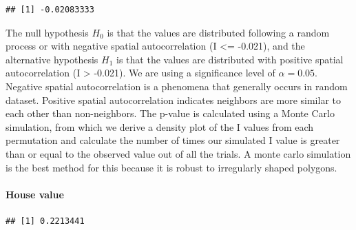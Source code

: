 \documentclass[
]{article}
\newenvironment{Shaded}{\begin{snugshade}}{\end{snugshade}}
\newcommand{\AttributeTok}[1]{\textcolor[rgb]{0.77,0.63,0.00}{#1}}
\newcommand{\CommentTok}[1]{\textcolor[rgb]{0.56,0.35,0.01}{\textit{#1}}}
\newcommand{\ConstantTok}[1]{\textcolor[rgb]{0.00,0.00,0.00}{#1}}
\newcommand{\ControlFlowTok}[1]{\textcolor[rgb]{0.13,0.29,0.53}{\textbf{#1}}}
\newcommand{\DecValTok}[1]{\textcolor[rgb]{0.00,0.00,0.81}{#1}}
\newcommand{\DocumentationTok}[1]{\textcolor[rgb]{0.56,0.35,0.01}{\textbf{\textit{#1}}}}
\newcommand{\FunctionTok}[1]{\textcolor[rgb]{0.00,0.00,0.00}{#1}}
\newcommand{\NormalTok}[1]{#1}
\newcommand{\OtherTok}[1]{\textcolor[rgb]{0.56,0.35,0.01}{#1}}
\newcommand{\SpecialCharTok}[1]{\textcolor[rgb]{0.00,0.00,0.00}{#1}}
\newcommand{\StringTok}[1]{\textcolor[rgb]{0.31,0.60,0.02}{#1}}
\begin{document}
\begin{verbatim}
## [1] -0.02083333
\end{verbatim}

The null hypothesis \(H_0\) is that the values are distributed following
a random process or with negative spatial autocorrelation (I \textless=
-0.021), and the alternative hypothesis \(H_1\) is that the values are
distributed with positive spatial autocorrelation (I \textgreater{}
-0.021). We are using a significance level of \(\alpha = 0.05\).
Negative spatial autocorrelation is a phenomena that generally occurs in
random dataset. Positive spatial autocorrelation indicates neighbors are
more similar to each other than non-neighbors. The p-value is calculated
using a Monte Carlo simulation, from which we derive a density plot of
the I values from each permutation and calculate the number of times our
simulated I value is greater than or equal to the observed value out of
all the trials. A monte carlo simulation is the best method for this
because it is robust to irregularly shaped polygons.

\hypertarget{house-value}{%
\paragraph{House value}\label{house-value}}

\begin{Shaded}
\end{Shaded}

\begin{verbatim}
## [1] 0.2213441
\end{verbatim}

\begin{Shaded}
\end{Shaded}
\end{document}
